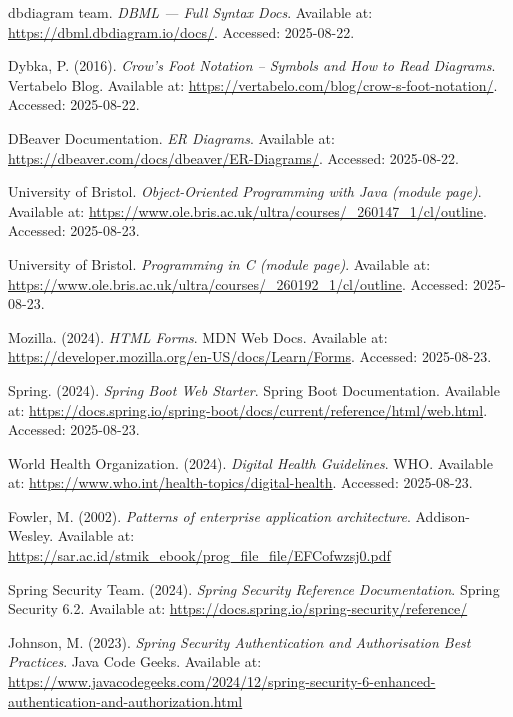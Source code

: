\begin{thebibliography}{99}
dbdiagram team. \emph{DBML — Full Syntax Docs}. Available at:
\url{https://dbml.dbdiagram.io/docs/}. Accessed: 2025-08-22.

Dybka, P. (2016). \emph{Crow's Foot Notation – Symbols and How to Read Diagrams}.
Vertabelo Blog. Available at:
\url{https://vertabelo.com/blog/crow-s-foot-notation/}. Accessed: 2025-08-22.

DBeaver Documentation. \emph{ER Diagrams}. Available at:
\url{https://dbeaver.com/docs/dbeaver/ER-Diagrams/}. Accessed: 2025-08-22.

University of Bristol.
\emph{Object-Oriented Programming with Java (module page)}.
Available at: \url{https://www.ole.bris.ac.uk/ultra/courses/_260147_1/cl/outline}.
Accessed: 2025-08-23.

University of Bristol.
\emph{Programming in C (module page)}.
Available at: \url{https://www.ole.bris.ac.uk/ultra/courses/_260192_1/cl/outline}.
Accessed: 2025-08-23.

    Mozilla. (2024). \emph{HTML Forms}. MDN Web Docs.
    Available at: \url{https://developer.mozilla.org/en-US/docs/Learn/Forms}.
    Accessed: 2025-08-23.

    Spring. (2024). \emph{Spring Boot Web Starter}. Spring Boot Documentation.
    Available at: \url{https://docs.spring.io/spring-boot/docs/current/reference/html/web.html}.
    Accessed: 2025-08-23.

    World Health Organization. (2024). \emph{Digital Health Guidelines}. WHO.
    Available at: \url{https://www.who.int/health-topics/digital-health}.
    Accessed: 2025-08-23.

    Fowler, M. (2002). \emph{Patterns of enterprise application architecture}. Addison-Wesley.
    Available at: \url{https://sar.ac.id/stmik_ebook/prog_file_file/EFCofwzsj0.pdf}

    Spring Security Team. (2024). \emph{Spring Security Reference Documentation}. Spring Security 6.2.
    Available at: \url{https://docs.spring.io/spring-security/reference/}

    Johnson, M. (2023). \emph{Spring Security Authentication and Authorisation Best Practices}. Java Code Geeks.
    Available at: \url{https://www.javacodegeeks.com/2024/12/spring-security-6-enhanced-authentication-and-authorization.html}

\end{thebibliography}
